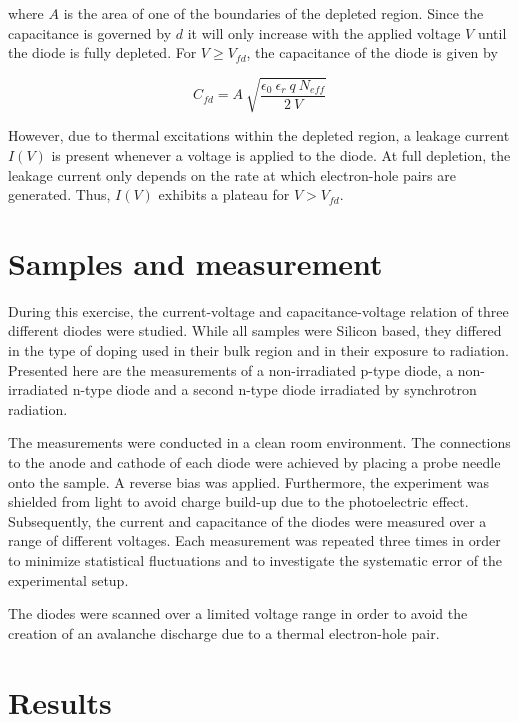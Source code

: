 \documentclass[11pt]{report}
\begin{document}
where $A$ is the area of one of the boundaries of the depleted region. Since the capacitance is governed by $d$ it will only increase with the applied voltage $V$ until the diode is fully depleted. For $V \geq V_{fd}$, the capacitance of the diode is given by

\begin{equation}
  \label{eq:1}
   C_{fd} = A ~ \sqrt{\frac{\epsilon_0 ~ \epsilon_r ~q ~ N_{eff}}{2 ~ V}}
\end{equation}

However, due to thermal excitations within the depleted region, a leakage current $I(V)$ is present whenever a voltage is applied to the diode.
At full depletion, the leakage current only depends on the rate at which electron-hole pairs are generated. Thus, $I(V)$ exhibits a plateau for $V>V_{fd}$.


\section*{Samples and measurement}
\label{sec:samples}

During this exercise, the current-voltage and capacitance-voltage relation of three different diodes were studied. While all samples were Silicon based, they differed in the type of doping used in their bulk region and in their exposure to radiation.
Presented here are the measurements of a non-irradiated p-type diode, a non-irradiated n-type diode and a second n-type diode irradiated by synchrotron radiation. 

The measurements were conducted in a clean room environment. The connections to the anode and cathode of each diode were achieved by placing a probe needle onto the sample.
A reverse bias was applied.
Furthermore, the experiment was shielded from light to avoid charge build-up due to the photoelectric effect. Subsequently, the current and capacitance of the diodes were measured over a range of different voltages. Each measurement was repeated three times in order to minimize statistical fluctuations and to investigate the systematic error of the experimental setup.

The diodes were scanned over a limited voltage range in order to avoid the creation of an avalanche discharge due to a thermal electron-hole pair.


\section*{Results}
\end{document}

